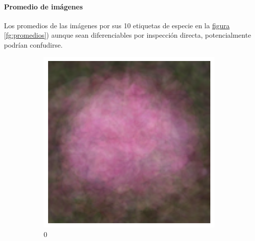 \documentclass{article}
\begin{document}

\paragraph{Promedio de imágenes} Los promedios de las imágenes por sus 10 etiquetas de especie en la \hyperref[fg:promedios]{figura \ref*{fg:promedios}}) aunque sean diferenciables por inspección directa, potencialmente podrían confudirse.

\begin{figure}
	\centering
	\begin{subfigure}[b]{0.09\textwidth}
		\includegraphics[width= \textwidth]{ave0}
		\caption{0}
	\end{subfigure}
	\begin{subfigure}[b]{0.09\textwidth}

\end{subfigure}
\end{figure}
\end{document}

